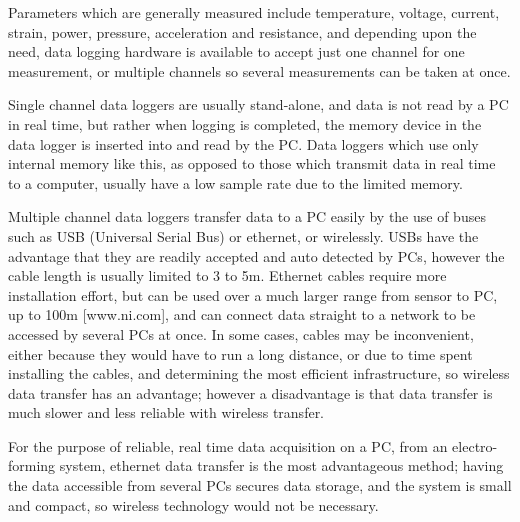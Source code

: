 Parameters which are generally measured include temperature, voltage, current, strain, power, pressure, acceleration and resistance, and depending upon the need, data logging hardware is available to accept just one channel for one measurement, or multiple channels so several measurements can be taken at once. 

Single channel data loggers are usually stand-alone, and data is not read by a PC in real time, but rather when logging is completed, the memory device in the data logger is inserted into and read by the PC. Data loggers which use only internal memory like this, as opposed to those which transmit data in real time to a computer, usually have a low sample rate due to the limited memory.

Multiple channel data loggers transfer data to a PC easily by the use of buses such as USB (Universal Serial Bus) or ethernet, or wirelessly. USBs have the advantage that they are readily accepted and auto detected by PCs, however the cable length is usually limited to 3 to 5m. Ethernet cables require more installation effort, but can be used over a much larger range from sensor to PC, up to 100m [www.ni.com], and can connect data straight to a network to be accessed by several PCs at once. In some cases, cables may be inconvenient, either because they would have to run a long distance, or due to time spent installing the cables, and determining the most efficient infrastructure, so wireless data transfer has an advantage; however a disadvantage is that data transfer is much slower and less reliable with wireless transfer.

For the purpose of reliable, real time data acquisition on a PC, from an electro-forming system, ethernet data transfer is the most advantageous method; having the data accessible from several PCs secures data storage, and the system is small and compact, so wireless technology would not be necessary. 
